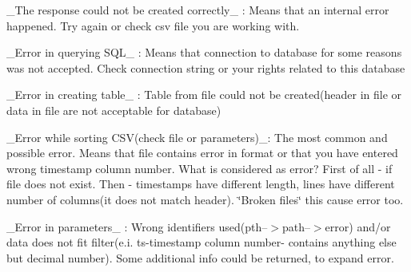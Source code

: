 {\ttfamily \+\_\+\+The response could not be created correctly\+\_\+} \+: Means that an internal error happened. Try again or check csv file you are working with.

{\ttfamily \+\_\+\+Error in querying S\+Q\+L\+\_\+} \+: Means that connection to database for some reasons was not accepted. Check connection string or your rights related to this database

{\ttfamily \+\_\+\+Error in creating table\+\_\+} \+: Table from file could not be created(header in file or data in file are not acceptable for database)

{\ttfamily \+\_\+\+Error while sorting C\+S\+V(check file or parameters)\+\_\+}\+: The most common and possible error. Means that file contains error in format or that you have entered wrong timestamp column number. What is considered as error? First of all -\/ if file does not exist. Then -\/ timestamps have different length, lines have different number of columns(it does not match header). \char`\"{}\+Broken files\char`\"{} this cause error too.

{\ttfamily \+\_\+\+Error in parameters\+\_\+} \+: Wrong identifiers used(pth--$>$path--$>$error) and/or data does not fit filter(e.\+i. ts-\/timestamp column number-\/ contains anything else but decimal number). Some additional info could be returned, to expand error. 